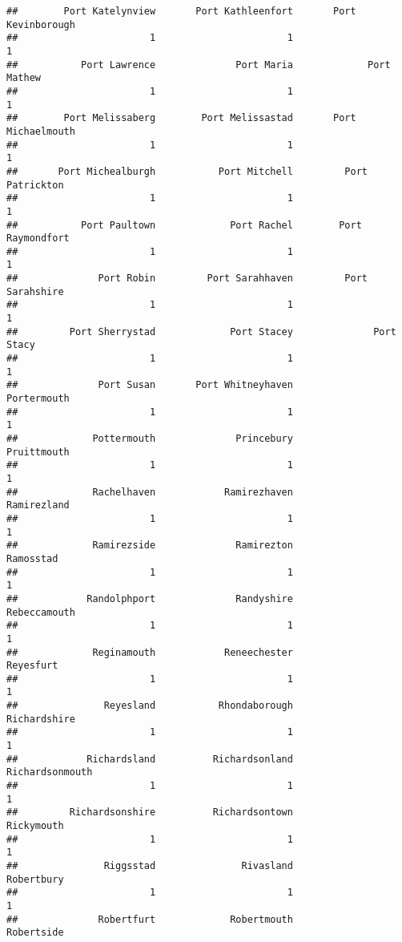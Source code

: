 \documentclass[
]{article}
\begin{document}
\begin{verbatim}
##        Port Katelynview       Port Kathleenfort       Port Kevinborough 
##                       1                       1                       1 
##           Port Lawrence              Port Maria             Port Mathew 
##                       1                       1                       1 
##        Port Melissaberg        Port Melissastad       Port Michaelmouth 
##                       1                       1                       1 
##       Port Michealburgh           Port Mitchell         Port Patrickton 
##                       1                       1                       1 
##           Port Paultown             Port Rachel        Port Raymondfort 
##                       1                       1                       1 
##              Port Robin         Port Sarahhaven         Port Sarahshire 
##                       1                       1                       1 
##         Port Sherrystad             Port Stacey              Port Stacy 
##                       1                       1                       1 
##              Port Susan       Port Whitneyhaven             Portermouth 
##                       1                       1                       1 
##             Pottermouth              Princebury             Pruittmouth 
##                       1                       1                       1 
##             Rachelhaven            Ramirezhaven             Ramirezland 
##                       1                       1                       1 
##             Ramirezside              Ramirezton               Ramosstad 
##                       1                       1                       1 
##            Randolphport              Randyshire            Rebeccamouth 
##                       1                       1                       1 
##             Reginamouth            Reneechester               Reyesfurt 
##                       1                       1                       1 
##               Reyesland           Rhondaborough            Richardshire 
##                       1                       1                       1 
##            Richardsland          Richardsonland         Richardsonmouth 
##                       1                       1                       1 
##         Richardsonshire          Richardsontown              Rickymouth 
##                       1                       1                       1 
##               Riggsstad               Rivasland              Robertbury 
##                       1                       1                       1 
##              Robertfurt             Robertmouth              Robertside 

\end{verbatim}
\end{document}
